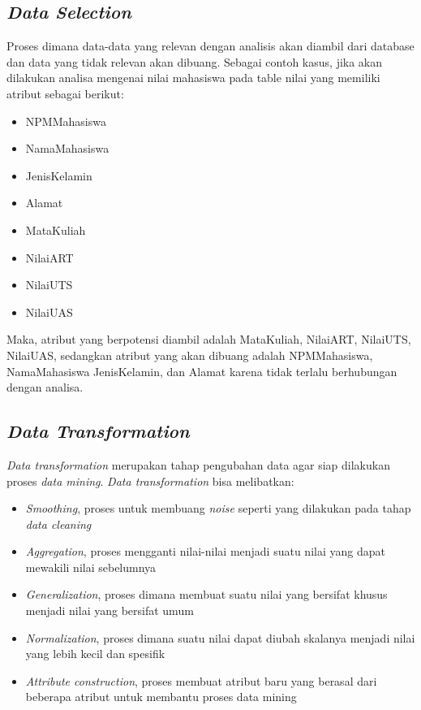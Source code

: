 \subsection{\textsl{Data Selection}}
Proses dimana data-data yang relevan dengan analisis akan diambil dari database dan data yang tidak relevan akan dibuang. Sebagai contoh kasus, jika akan dilakukan analisa mengenai nilai mahasiswa pada table nilai yang memiliki atribut sebagai berikut:
	\begin{itemize}
		\item NPMMahasiswa
		\item NamaMahasiswa
		\item JenisKelamin
		\item Alamat
		\item MataKuliah
		\item NilaiART
		\item NilaiUTS
		\item NilaiUAS
	\end{itemize}
Maka, atribut yang berpotensi diambil adalah MataKuliah, NilaiART, NilaiUTS, NilaiUAS, sedangkan atribut yang akan dibuang adalah NPMMahasiswa, NamaMahasiswa JenisKelamin, dan Alamat karena tidak terlalu berhubungan dengan analisa.

\subsection{\textsl{Data Transformation}}
\textsl{Data transformation} merupakan tahap pengubahan data agar siap dilakukan proses \textsl{data mining}. \textsl{Data transformation} bisa melibatkan:
	\begin{itemize}
		\item \textsl{Smoothing}, proses untuk membuang \textsl{noise} seperti yang dilakukan pada tahap \textsl{data cleaning}
		\item \textsl{Aggregation}, proses mengganti nilai-nilai menjadi suatu nilai yang dapat mewakili nilai sebelumnya
		\item \textsl{Generalization}, proses dimana membuat suatu nilai yang bersifat khusus menjadi nilai yang bersifat umum
		\item \textsl{Normalization}, proses dimana suatu nilai dapat diubah skalanya menjadi nilai yang lebih kecil dan spesifik
		\item \textsl{Attribute construction}, proses membuat atribut baru yang berasal dari beberapa atribut untuk membantu proses data mining
	\end{itemize}
	
